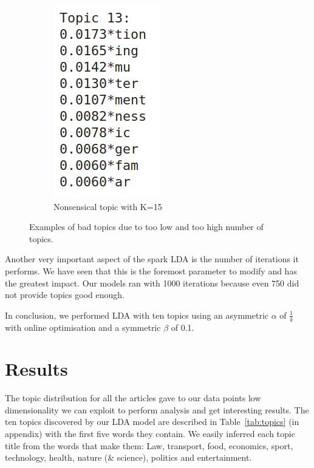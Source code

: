 \documentclass[11pt]{article}
\begin{document}
\begin{figure}[htpb!]
\begin{subfigure}[t]{.45\linewidth}
    \includegraphics[height=1\linewidth]{images/K=15.png}
    \caption{Nonsensical topic with K=15}
    \label{fig:topicsb}
  \end{subfigure}
  \caption{Examples of bad topics due to too low and too high number of topics.}
  \label{fig:topics}
\end{figure}

Another very important aspect of the spark LDA is the number of iterations it performs. We have seen that this is the foremost parameter to modify and has the greatest impact. Our models ran with 1000 iterations because even 750 did not provide topics good enough.

In conclusion, we performed LDA with ten topics using an asymmetric $\alpha$ of $\frac{1}{k}$ with online optimisation and a symmetric $\beta$ of 0.1.

\section{Results}

The topic distribution for all the articles gave to our data points low dimensionality we can exploit to perform analysis and get interesting results.
The ten topics discovered by our LDA model are described in Table~\ref{tab:topics} (in appendix) with the first five words they contain. We easily inferred each topic title from the words that make them: Law, transport, food, economics, sport, technology, health, nature (\& science), politics and entertainment.
\end{document}
